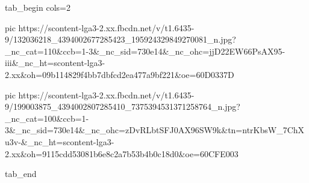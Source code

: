  
 
 
 
 

\ifcmt
  tab_begin cols=2

     pic https://scontent-lga3-2.xx.fbcdn.net/v/t1.6435-9/132036218_4394002677285423_195924329849270081_n.jpg?_nc_cat=110&ccb=1-3&_nc_sid=730e14&_nc_ohc=jjD22EW66PsAX95-iii&_nc_ht=scontent-lga3-2.xx&oh=09b114829f4bb7dbfcd2ea477a9bf221&oe=60D0337D

     pic https://scontent-lga3-2.xx.fbcdn.net/v/t1.6435-9/199003875_4394002807285410_7375394531371258764_n.jpg?_nc_cat=100&ccb=1-3&_nc_sid=730e14&_nc_ohc=zDvRLbtSFJ0AX96SW9k&tn=ntrKbsW_7ChXu3v-&_nc_ht=scontent-lga3-2.xx&oh=9115cdd53081b6e8c2a7b53b4b0c18d0&oe=60CFE003

  tab_end
\fi

